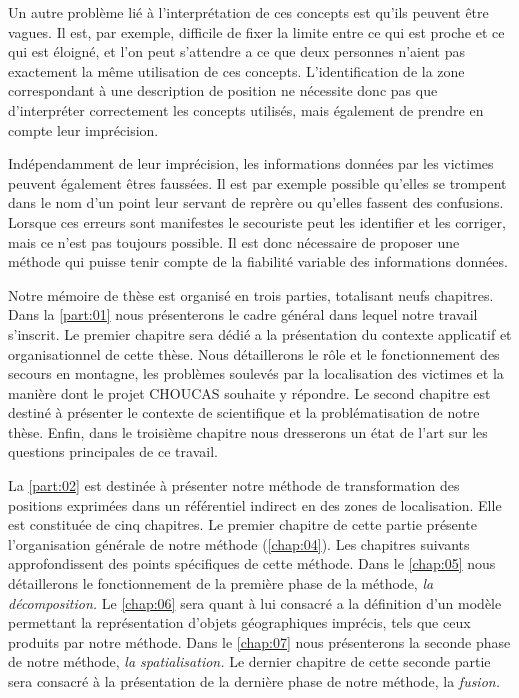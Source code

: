 Un autre problème lié à l'interprétation de ces concepts est qu'ils
peuvent être vagues.  Il est, par exemple, difficile de fixer la
limite entre ce qui est proche et ce qui est éloigné, et l'on peut
s'attendre a ce que deux personnes n'aient pas exactement la même
utilisation de ces concepts. L’identification de la zone correspondant
à une description de position ne nécessite donc pas que d'interpréter
correctement les concepts utilisés, mais également de prendre en
compte leur imprécision.

Indépendamment de leur imprécision, les informations données par les
victimes peuvent également êtres faussées. Il est par exemple possible
qu'elles se trompent dans le nom d'un point leur servant de reprère ou
qu'elles fassent des confusions. Lorsque ces erreurs sont manifestes
le secouriste peut les identifier et les corriger, mais ce n'est pas
toujours possible. Il est donc nécessaire de proposer une méthode qui
puisse tenir compte de la fiabilité variable des informations données.



Notre mémoire de thèse est organisé en trois parties, totalisant neufs
chapitres. Dans la \autoref{part:01} nous présenterons le cadre
général dans lequel notre travail s'inscrit. Le premier chapitre sera
dédié a la présentation du contexte applicatif et organisationnel de
cette thèse. Nous détaillerons le rôle et le fonctionnement des
secours en montagne, les problèmes soulevés par la localisation des
victimes et la manière dont le projet CHOUCAS souhaite y répondre. Le
second chapitre est destiné à présenter le contexte de scientifique et
la problématisation de notre thèse. Enfin, dans le troisième chapitre
nous dresserons un état de l'art sur les questions principales de ce
travail.

La \autoref{part:02} est destinée à présenter notre méthode de
transformation des positions exprimées dans un référentiel indirect en
des zones de localisation. Elle est constituée de cinq chapitres. Le
premier chapitre de cette partie présente l’organisation générale de
notre méthode (\autoref{chap:04}). Les chapitres suivants
approfondissent des points spécifiques de cette méthode. Dans le
\autoref{chap:05} nous détaillerons le fonctionnement de la première
phase de la méthode, \emph{la décomposition.} Le \autoref{chap:06}
sera quant à lui consacré a la définition d'un modèle permettant la
représentation d'objets géographiques imprécis, tels que ceux produits
par notre méthode. Dans le \autoref{chap:07} nous présenterons la
seconde phase de notre méthode, \emph{la spatialisation.} Le dernier
chapitre de cette seconde partie sera consacré à la présentation de la
dernière phase de notre méthode, la \emph{fusion.}

